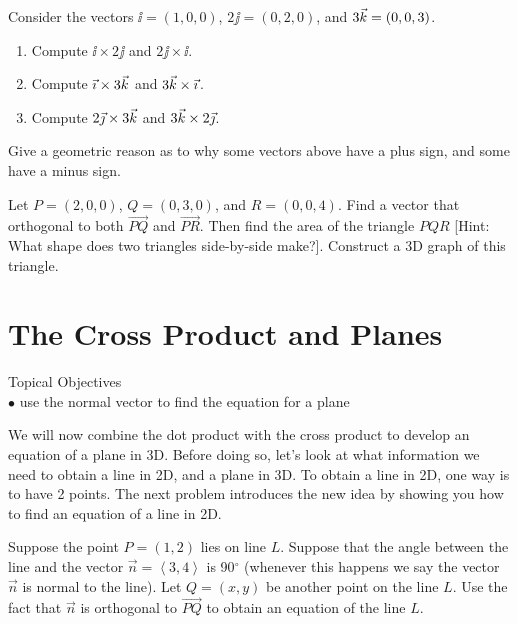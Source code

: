 \begin{problem} 
%
Consider the vectors ${\ii}=(1,0,0)$, ${2\jj}=(0,2,0)$, and ${3\vec k}=(0,0,3)$.
\begin{enumerate}
\item Compute $\ii\times {2\jj}$ and ${2\jj}\times {\ii}$.
\item Compute ${\vec \imath}\times {3\ensuremath{\vec k}}$ and ${3\vec k}\times {\ensuremath{\vec \imath}}$.
\item Compute ${2\vec \jmath}\times {3\ensuremath{\vec k}}$ and ${3\vec k}\times {2\ensuremath{\vec \jmath}}$.
\end{enumerate}
Give a geometric reason as to why some vectors above have a plus sign, and some have a minus sign.
\end{problem}

\begin{problem}  
%
Let $P=(2,0,0)$, $Q=(0,3,0)$, and $R=(0,0,4)$. Find a vector that orthogonal to both $\vec {PQ}$ and $\vec {PR}$. Then find the area of the triangle $PQR$ [Hint: What shape does two triangles side-by-side make?]. Construct a 3D graph of this triangle. 
\end{problem}

\section{The Cross Product and Planes}
\large Topical Objectives \normalsize \\
\indent $\bullet$ use the normal vector to find the equation for a plane

\vskip0.2in

We will now combine the dot product with the cross product to develop an equation of a plane in 3D. 
Before doing so, let's look at what information we need to obtain a line in 2D, and a plane in 3D.  
To obtain a line in 2D, one way is to have 2 points. 
The next problem introduces the new idea by showing you how to find an equation of a line in 2D. 

\begin{problem}\label{prob:plane equation normal point}
Suppose the point $P=(1,2)$ lies on line $L$. Suppose that the angle between the line and the vector $\vec n=\left<3,4\right>$ is 90$^\circ$ (whenever this happens we say the vector $\vec n$ is normal to the line). Let $Q=(x,y)$ be another point on the line $L$. Use the fact that $\vec n$ is orthogonal to $\vec {PQ}$ to obtain an equation of the line $L$. 
\end{problem}

